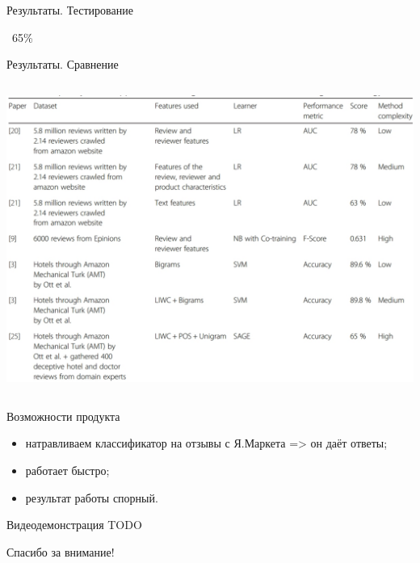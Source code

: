 \documentclass[mathserif,utf8,14pt]{beamer}
\begin{document}
\begin{frame}{Результаты. Тестирование}
     \addtocounter{framenumber}{-1}
     \begin{center}
        \Huge ~65\%
     \end{center}
\end{frame}

\begin{frame}{Результаты. Сравнение}
     \addtocounter{framenumber}{-1}
     \begin{columns}
         \column{\dimexpr\paperwidth-10pt}
     \includegraphics[scale=0.3]{./converted_jpg.pdf}
     \end{columns}
\end{frame}

\begin{frame}{Возможности продукта}
    \begin{itemize}
        \item натравливаем классификатор на отзывы с Я.Маркета => он даёт ответы;
        \item работает быстро;
        \item результат работы спорный.
    \end{itemize}
\end{frame}

\begin{frame}{Видеодемонстрация}
    TODO
\end{frame}
 
\begin{frame}{}
    \begin{center}
    \large Спасибо за внимание!
    \end{center}
\end{frame}
\end{document}
